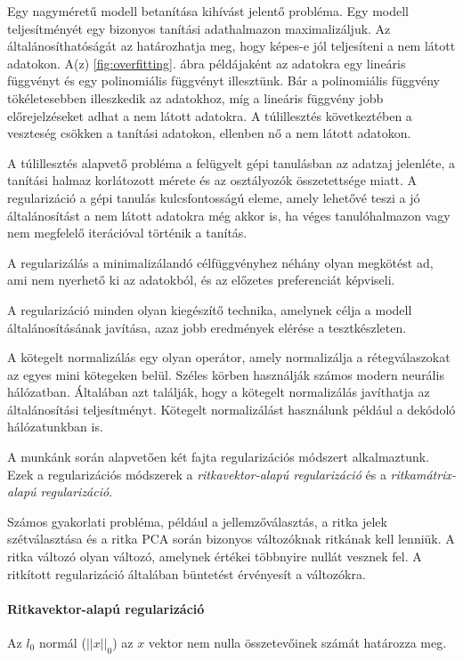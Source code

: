 \documentclass[12pt,a4]{article}
\begin{document}
        Egy nagyméretű modell betanítása kihívást jelentő probléma. Egy modell teljesítményét egy bizonyos tanítási adathalmazon maximalizáljuk. Az általánosíthatóságát az határozhatja meg, hogy képes-e jól teljesíteni a nem látott adatokon. A(z) \ref{fig:overfitting}. ábra példájaként az adatokra egy lineáris függvényt és egy polinomiális függvényt illesztünk. Bár a polinomiális függvény tökéletesebben illeszkedik az adatokhoz, míg a lineáris függvény jobb előrejelzéseket adhat a nem látott adatokra. A túlillesztés következtében a veszteség csökken a tanítási adatokon, ellenben nő a nem látott adatokon.

        A túlillesztés alapvető probléma a felügyelt gépi tanulásban az adatzaj jelenléte, a tanítási halmaz korlátozott mérete és az osztályozók összetettsége miatt. A regularizáció a gépi tanulás kulcsfontosságú eleme, amely lehetővé teszi a jó általánosítást a nem látott adatokra még akkor is, ha véges tanulóhalmazon vagy nem megfelelő iterációval történik a tanítás.

        A regularizálás a minimalizálandó célfüggvényhez néhány olyan megkötést ad, ami nem nyerhető ki az adatokból, és az előzetes preferenciát képviseli.

        A regularizáció minden olyan kiegészítő technika, amelynek célja a modell általánosításának javítása, azaz jobb eredmények elérése a tesztkészleten.

        A kötegelt normalizálás egy olyan operátor, amely normalizálja a rétegválaszokat az egyes mini kötegeken belül. Széles körben használják számos modern neurális hálózatban. Általában azt találják, hogy a kötegelt normalizálás javíthatja az általánosítási teljesítményt. Kötegelt normalizálást használunk például a dekódoló hálózatunkban is.

        A munkánk során alapvetően két fajta regularizációs módszert alkalmaztunk. Ezek a regularizációs  módszerek a \textit{ritkavektor-alapú regularizáció} és a \textit{ritkamátrix-alapú regularizáció}.

        Számos gyakorlati probléma, például a jellemzőválasztás, a ritka jelek szétválasztása és a ritka PCA során bizonyos változóknak ritkának kell lenniük. A ritka változó olyan változó, amelynek értékei többnyire nullát vesznek fel. A ritkított regularizáció általában büntetést érvényesít a változókra.
        
        \paragraph{Ritkavektor-alapú regularizáció}
        Az $l_{0}$ normál ($|| x ||_{0}$) az $x$ vektor nem nulla összetevőinek számát határozza meg.
        
\end{document}
